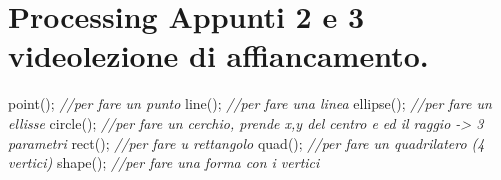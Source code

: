 \documentclass[
]{article}
\author{}
\date{}
\newenvironment{Shaded}{}{}
\newcommand{\CommentTok}[1]{\textcolor[rgb]{0.38,0.63,0.69}{\textit{#1}}}
\newcommand{\FunctionTok}[1]{\textcolor[rgb]{0.02,0.16,0.49}{#1}}
\newcommand{\OperatorTok}[1]{\textcolor[rgb]{0.40,0.40,0.40}{#1}}
\begin{document}
\section{Processing Appunti 2 e 3 videolezione di
affiancamento.}\label{processing-appunti-2-e-3-videolezione-di-affiancamento}

\begin{Shaded}
\begin{Highlighting}[]
\FunctionTok{point}\OperatorTok{();} \CommentTok{//per fare un punto}
\FunctionTok{line}\OperatorTok{();} \CommentTok{//per fare una linea}
\FunctionTok{ellipse}\OperatorTok{();} \CommentTok{//per fare un ellisse}
\FunctionTok{circle}\OperatorTok{();} \CommentTok{//per fare un cerchio, prende x,y del centro e ed il raggio {-}\textgreater{} 3 parametri}
\FunctionTok{rect}\OperatorTok{();} \CommentTok{//per fare u rettangolo}
\FunctionTok{quad}\OperatorTok{();} \CommentTok{//per fare un quadrilatero (4 vertici)}
\FunctionTok{shape}\OperatorTok{();} \CommentTok{//per fare una forma con i vertici}
\end{Highlighting}
\end{Shaded}
\end{document}
